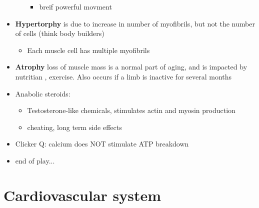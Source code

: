 \documentclass{article}
\theoremstyle{definition}
\begin{document}
\begin{itemize}
\begin{itemize}
\begin{itemize}
					\item breif powerful movment
				\end{itemize}
		\end{itemize}
	\item \textbf{Hypertorphy}  is due to increase in number of myofibrils, but not the number of cells (think body builders)
		\begin{itemize}
			\item Each muscle cell has multiple myofibrils
		\end{itemize}
	\item \textbf{Atrophy}  loss of muscle mass is a normal part of aging, and is impacted by nutritian , exercise. Also occurs if a limb is inactive for several months
	\item Anabolic steroids:
		\begin{itemize}
			\item Testosterone-like chemicals, stimulates actin and myosin production
			\item cheating, long term side effects
		\end{itemize}
	\item Clicker Q: calcium does NOT stimulate ATP breakdown
	\item end of play...
\end{itemize}

\section{Cardiovascular system}
\end{document}
